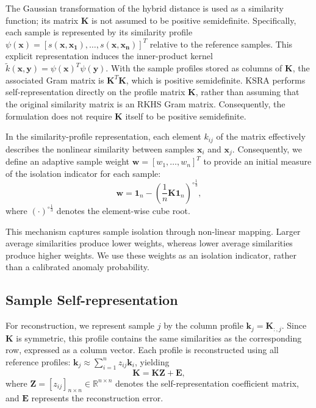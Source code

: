 \documentclass[ASNA,twocolumn]{USG} %
\begin{document}
The Gaussian transformation of the hybrid distance is used as a similarity function; its matrix $\boldsymbol{K}$ is not assumed to be positive semidefinite. Specifically, each sample is represented by its similarity profile $\psi(\boldsymbol{x})=[s(\boldsymbol{x},\boldsymbol{x_1}),\ldots,s(\boldsymbol{x},\boldsymbol{x_n})]^T$ relative to the reference samples. This explicit representation induces the inner-product kernel $\tilde{k}(\boldsymbol{x},\boldsymbol{y})=\psi(\boldsymbol{x})^T\psi(\boldsymbol{y})$. With the sample profiles stored as columns of $\boldsymbol K$, the associated Gram matrix is $\boldsymbol K^T\boldsymbol K$, which is positive semidefinite. KSRA performs self-representation directly on the profile matrix $\boldsymbol{K}$, rather than assuming that the original similarity matrix is an RKHS Gram matrix. Consequently, the formulation does not require $\boldsymbol{K}$ itself to be positive semidefinite.

In the similarity-profile representation, each element $k_{ij}$ of the matrix effectively describes the nonlinear similarity between samples $\boldsymbol{x}_i$ and $\boldsymbol{x}_j$. Consequently, we define an adaptive sample weight $\boldsymbol{w} = [w_1, \dots, w_n]^T$ to provide an initial measure of the isolation indicator for each sample:
\begin{equation}\label{initial_anomaly_belief}
\boldsymbol{w} = \boldsymbol{1}_n - \left( \frac{1}{n} \boldsymbol{K}\boldsymbol{1}_n \right)^{\circ \frac{1}{3}},
\end{equation}
where $(\cdot)^{\circ \frac{1}{3}}$ denotes the element-wise cube root.

This mechanism captures sample isolation through non-linear mapping. Larger average similarities produce lower weights, whereas lower average similarities produce higher weights. We use these weights as an isolation indicator, rather than a calibrated anomaly probability.

\subsection{Sample Self-representation}

For reconstruction, we represent sample $j$ by the column profile $\boldsymbol{k}_j=\boldsymbol{K}_{:,j}$. Since $\boldsymbol K$ is symmetric, this profile contains the same similarities as the corresponding row, expressed as a column vector. Each profile is reconstructed using all reference profiles:
$\boldsymbol{k}_j\approx\sum_{i=1}^{n}z_{ij}\boldsymbol{k}_i$, yielding
\begin{equation}
\boldsymbol{K} = \boldsymbol{K} \boldsymbol{Z} + \boldsymbol{E},
\end{equation}
where $\boldsymbol{Z} = [z_{ij}]_{n \times n} \in \mathbb{R}^{n \times n}$ denotes the self-representation coefficient matrix, and $\boldsymbol{E}$ represents the reconstruction error. 
\end{document}
